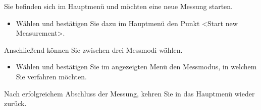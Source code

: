 \label{Durchführung}

Sie befinden sich im Hauptmenü und möchten eine neue Messung starten.
\begin{itemize}
	\item Wählen und bestätigen Sie dazu im Hauptmenü den Punkt <Start new Measurement>.	
\end{itemize}
Anschließend können Sie zwischen drei Messmodi wählen.
\begin{itemize}
	\item Wählen und bestätigen Sie im angezeigten Menü den Messmodus, in welchem Sie verfahren möchten.	
\end{itemize}
Nach erfolgreichem Abschluss der Messung, kehren Sie in das Hauptmenü wieder zurück.